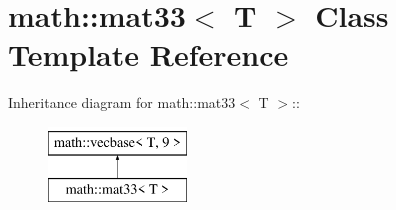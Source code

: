 \hypertarget{classmath_1_1mat33}{
\section{math::mat33$<$ T $>$ Class Template Reference}
\label{classmath_1_1mat33}
}
Inheritance diagram for math::mat33$<$ T $>$::\begin{figure}[H]
\begin{center}
\leavevmode
\includegraphics[height=2cm]{classmath_1_1mat33}
\end{center}
\end{figure}
